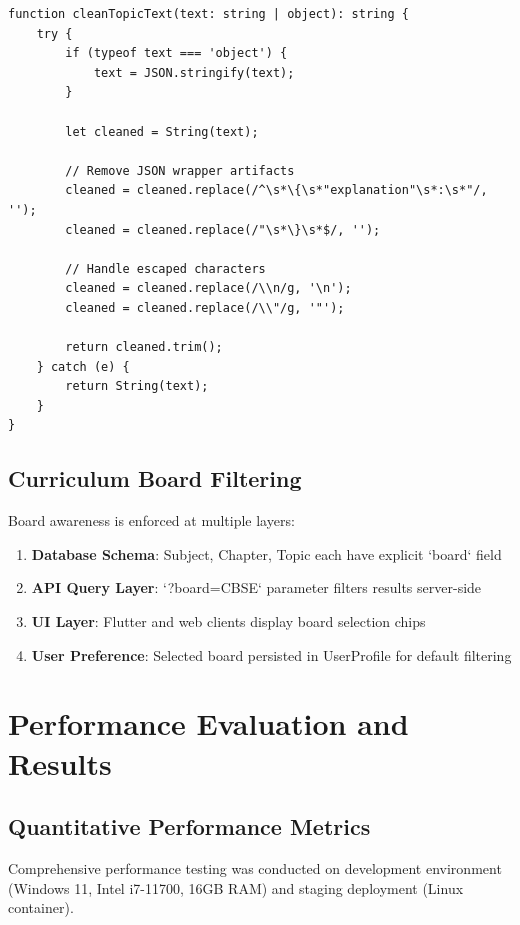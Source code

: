 \documentclass[10pt,conference,compsocconf]{IEEEtran}
\begin{document}
\begin{lstlisting}[caption=Client-Side Content Sanitization, label=lst:sanitize]
function cleanTopicText(text: string | object): string {
    try {
        if (typeof text === 'object') {
            text = JSON.stringify(text);
        }
        
        let cleaned = String(text);
        
        // Remove JSON wrapper artifacts
        cleaned = cleaned.replace(/^\s*\{\s*"explanation"\s*:\s*"/, '');
        cleaned = cleaned.replace(/"\s*\}\s*$/, '');
        
        // Handle escaped characters
        cleaned = cleaned.replace(/\\n/g, '\n');
        cleaned = cleaned.replace(/\\"/g, '"');
        
        return cleaned.trim();
    } catch (e) {
        return String(text);
    }
}
\end{lstlisting}

\subsection{Curriculum Board Filtering}

Board awareness is enforced at multiple layers:

\begin{enumerate}
    \item \textbf{Database Schema}: Subject, Chapter, Topic each have explicit `board` field
    \item \textbf{API Query Layer}: `?board=CBSE` parameter filters results server-side
    \item \textbf{UI Layer}: Flutter and web clients display board selection chips
    \item \textbf{User Preference}: Selected board persisted in UserProfile for default filtering
\end{enumerate}

\section{Performance Evaluation and Results}
\label{sec:evaluation}

\subsection{Quantitative Performance Metrics}

Comprehensive performance testing was conducted on development environment (Windows 11, Intel i7-11700, 16GB RAM) and staging deployment (Linux container).
\end{document}

